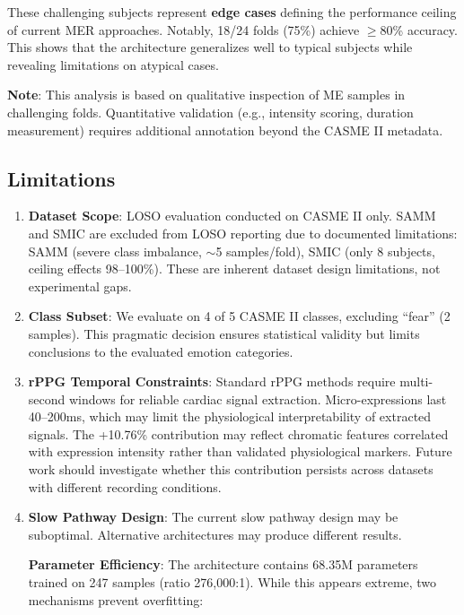 \documentclass[preprint,12pt,authoryear]{elsarticle}
\begin{document}
These challenging subjects represent \textbf{edge cases} defining the performance ceiling of current MER approaches. Notably, 18/24 folds (75\%) achieve $\geq$80\% accuracy. This shows that the architecture generalizes well to typical subjects while revealing limitations on atypical cases.

\textbf{Note}: This analysis is based on qualitative inspection of ME samples in challenging folds. Quantitative validation (e.g., intensity scoring, duration measurement) requires additional annotation beyond the CASME II metadata.

\subsection{Limitations}

\begin{enumerate}
\item \textbf{Dataset Scope}: LOSO evaluation conducted on CASME II only. SAMM and SMIC are excluded from LOSO reporting due to documented limitations: SAMM (severe class imbalance, $\sim$5 samples/fold), SMIC (only 8 subjects, ceiling effects 98--100\%). These are inherent dataset design limitations, not experimental gaps.

\item \textbf{Class Subset}: We evaluate on 4 of 5 CASME II classes, excluding ``fear'' (2 samples). This pragmatic decision ensures statistical validity but limits conclusions to the evaluated emotion categories.

\item \textbf{rPPG Temporal Constraints}: Standard rPPG methods require multi-second windows for reliable cardiac signal extraction. Micro-expressions last 40--200ms, which may limit the physiological interpretability of extracted signals. The +10.76\% contribution may reflect chromatic features correlated with expression intensity rather than validated physiological markers. Future work should investigate whether this contribution persists across datasets with different recording conditions.

\item \textbf{Slow Pathway Design}: The current slow pathway design may be suboptimal. Alternative architectures may produce different results.

\textbf{Parameter Efficiency}: The architecture contains 68.35M parameters trained on 247 samples (ratio 276,000:1). While this appears extreme, two mechanisms prevent overfitting:


\end{enumerate}
\end{document}
